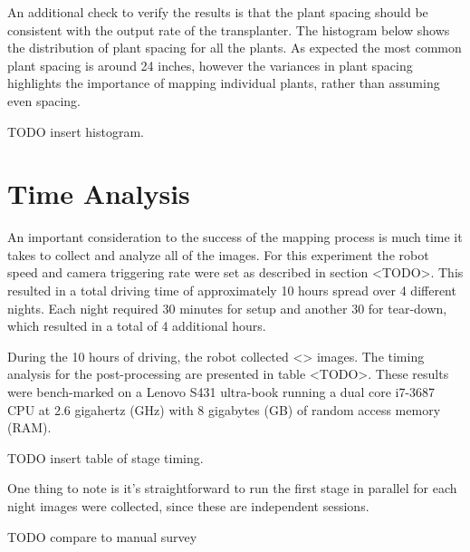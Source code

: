 An additional check to verify the results is that the plant spacing should be consistent with the output rate of the transplanter.  The histogram below shows the distribution of plant spacing for all the plants.  As expected the most common plant spacing is around 24 inches, however the variances in plant spacing highlights the importance of mapping individual plants, rather than assuming even spacing.

TODO insert histogram.

\section{Time Analysis}

An important consideration to the success of the mapping process is much time it takes to collect and analyze all of the images. For this experiment the robot speed and camera triggering rate were set as described in section <TODO>.  This resulted in a total driving time of approximately 10 hours spread over 4 different nights.  Each night required 30 minutes for setup and another 30 for tear-down, which resulted in a total of 4 additional hours.  

During the 10 hours of driving, the robot collected <> images.  The timing analysis for the post-processing are presented in table <TODO>. These results were bench-marked on a Lenovo S431 ultra-book running a dual core i7-3687 CPU at 2.6 gigahertz (GHz) with 8 gigabytes (GB) of random access memory (RAM).  

TODO insert table of stage timing.

One thing to note is it's straightforward to run the first stage in parallel for each night images were collected, since these are independent sessions.

TODO compare to manual survey
